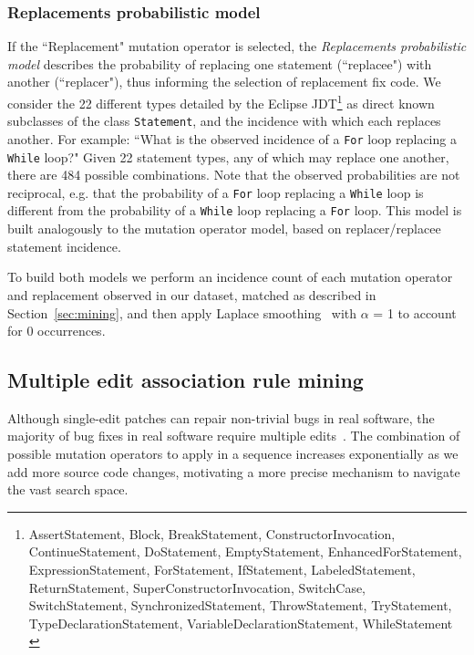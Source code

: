 \documentclass[conference]{IEEEtran}
\begin{document}
\subsubsection{Replacements probabilistic model}
If the ``Replacement" mutation operator is 
selected, the \textit{Replacements probabilistic model} describes the probability of replacing one statement (``replacee") with
another (``replacer"), thus informing the selection of replacement fix code.
We consider 
the 22 different types detailed by the Eclipse
JDT\footnote{AssertStatement, Block, BreakStatement, ConstructorInvocation, ContinueStatement, DoStatement, EmptyStatement, EnhancedForStatement, ExpressionStatement, ForStatement, IfStatement, LabeledStatement, ReturnStatement, SuperConstructorInvocation, SwitchCase, SwitchStatement, SynchronizedStatement, ThrowStatement, TryStatement, TypeDeclarationStatement, VariableDeclarationStatement, WhileStatement \label{stmtNames}} as
direct known subclasses of the class \texttt{Statement}, and the incidence with which
each 
replaces another. For example: ``What is the observed incidence of a \texttt{For} loop 
replacing a \texttt{While} loop?" Given 22 statement types, any of which may replace one
another, there are 484 possible combinations. 
Note that the observed probabilities are not reciprocal, e.g. 
that the probability of a \texttt{For} loop replacing a \texttt{While} loop is different from the 
probability of a \texttt{While} loop replacing a \texttt{For} loop.
This model is built analogously to the
mutation operator model, based on replacer/replacee statement incidence. 

\vspace{1ex}
To build both models we perform an incidence count of each mutation operator and replacement observed in our
dataset, matched as described in Section~\ref{sec:mining}, and then apply Laplace smoothing~\cite{Russell10} with $\alpha$ = 1 to account for 0 occurrences.

\subsection{Multiple edit association rule mining} 
\label{multEdit}

Although single-edit patches can
repair non-trivial bugs in real software, the majority of bug fixes in real
software require multiple edits~\cite{zhong15,Soto16}. The combination of possible mutation
 operators to apply in a sequence increases exponentially as we add more source
 code changes, motivating a more precise mechanism to navigate the vast search
 space. 
\end{document}
